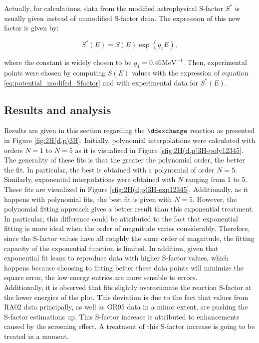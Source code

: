 \documentclass[openany]{book}
\begin{document}
Actually, for calculations, data from the modified astrophysical S-factor $S^{*}$ is usually given instead of unmodified S-factor data. The expression of this new factor is given by:

\begin{equation}\label{eq:potential_modifed_Sfactor}
	S^{*}(E) = S(E) \exp {(g_1E)},
\end{equation}

where the constant is widely chosen to be $g_1 = 0.46 \mathrm{MeV^{-1}}$. Then, experimental points were chosen by computing $S(E)$ values with the expression of equation \ref{eq:potential_modifed_Sfactor} and with experimental data for $S^{*}(E)$.


\subsection{Results and analysis} \label{sub:resultsAnalysisNonResonant}

Results are given in this section regarding the $\ddexchange$ reaction as presented in Figure \ref{fig:2H(d,p)3H}. Initially, polynomial interpolations were calculated with orders $N = 1$ to $N = 5$ as it is visualized in Figure \ref{sfig:2H(d,p)3H-poly12345}. The generality of these fits is that the greater the polynomial order, the better the fit. In particular, the best is obtained with a polynomial of order $N = 5$.  \\

Similarly, exponential interpolations were obtained with $N$ ranging from 1 to 5. These fits are visualized in Figure \ref{sfig:2H(d,p)3H-exp12345}. Additionally, as it happens with polynomial fits, the best fit is given with $N = 5$. However, the polynomial fitting approach gives a better result than this exponential treatment. \\

In particular, this difference could be attributed to the fact that exponential fitting is more ideal when the order of magnitude varies considerably. Therefore, since the S-factor values have all roughly the same order of magnitude, the fitting capacity of the exponential function is limited. In addition, given that exponential fit leans to reproduce data with higher S-factor values, which happens because choosing to fitting better these data points will minimize the square error, the low energy entries are more sensible to errors.  \\

Additionally, it is observed that fits slightly overestimate the reaction S-factor at the lower energies of the plot. This deviation is due to the fact that values from RA02 data principally, as well as GR95 data in a minor extent, are pushing the S-factor estimations up. This S-factor increase is attributed to enhancements caused by the screening effect. A treatment of this S-factor increase is going to be treated in a moment. \\
\end{document}
